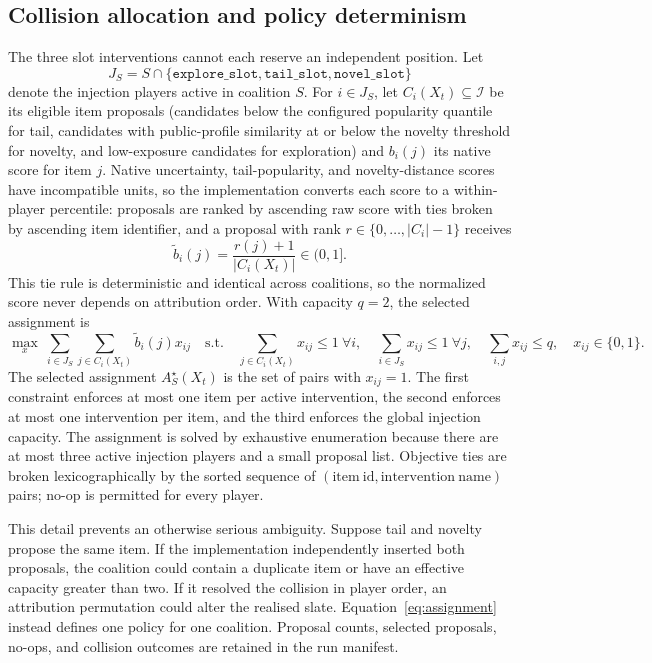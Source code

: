 \documentclass[pdflatex,sn-mathphys-num]{sn-jnl}
\theoremstyle{thmstyleone}
\theoremstyle{thmstyletwo}
\theoremstyle{thmstylethree}
\begin{document}
\subsection{Collision allocation and policy determinism}

The three slot interventions cannot each reserve an independent position. Let
\begin{equation}
 J_S=S\cap\{\texttt{explore\_slot},\texttt{tail\_slot},\texttt{novel\_slot}\}
\label{eq:injection-set}
\end{equation}
denote the injection players active in coalition $S$. For $i\in J_S$, let $C_i(X_t)\subseteq\mathcal{I}$ be its eligible item proposals (candidates below the configured popularity quantile for tail, candidates with public-profile similarity at or below the novelty threshold for novelty, and low-exposure candidates for exploration) and $b_i(j)$ its native score for item $j$. Native uncertainty, tail-popularity, and novelty-distance scores have incompatible units, so the implementation converts each score to a within-player percentile: proposals are ranked by ascending raw score with ties broken by ascending item identifier, and a proposal with rank $r\in\{0,\ldots,|C_i|-1\}$ receives
\begin{equation}
 \widetilde b_i(j)=\frac{r(j)+1}{|C_i(X_t)|}\in(0,1].
\label{eq:percentile}
\end{equation}
This tie rule is deterministic and identical across coalitions, so the normalized score never depends on attribution order. With capacity $q=2$, the selected assignment is
\begin{equation}
 \max_{x}\ \sum_{i\in J_S}\sum_{j\in C_i(X_t)}\widetilde b_i(j)x_{ij}
\quad\text{s.t.}\quad
\sum_{j\in C_i(X_t)}x_{ij}\leq1\ \forall i,\quad
\sum_{i\in J_S}x_{ij}\leq1\ \forall j,\quad
\sum_{i,j}x_{ij}\leq q,\quad x_{ij}\in\{0,1\}.
\label{eq:assignment}
\end{equation}
The selected assignment $A_S^{\star}(X_t)$ is the set of pairs with $x_{ij}=1$. The first constraint enforces at most one item per active intervention, the second enforces at most one intervention per item, and the third enforces the global injection capacity. The assignment is solved by exhaustive enumeration because there are at most three active injection players and a small proposal list. Objective ties are broken lexicographically by the sorted sequence of $(\mathrm{item\ id},\mathrm{intervention\ name})$ pairs; no-op is permitted for every player.

This detail prevents an otherwise serious ambiguity. Suppose tail and novelty propose the same item. If the implementation independently inserted both proposals, the coalition could contain a duplicate item or have an effective capacity greater than two. If it resolved the collision in player order, an attribution permutation could alter the realised slate. Equation~\eqref{eq:assignment} instead defines one policy for one coalition. Proposal counts, selected proposals, no-ops, and collision outcomes are retained in the run manifest.
\end{document}
